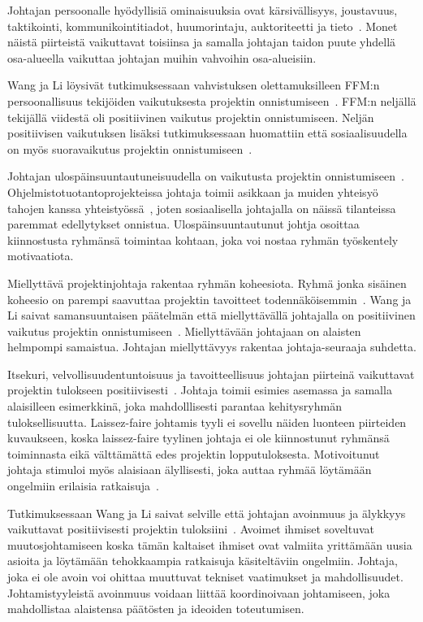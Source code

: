 \documentclass[finnish]{tktltiki2}
\theoremstyle{definition}
\theoremstyle{remark}
\begin{document}
Johtajan persoonalle hyödyllisiä ominaisuuksia ovat kärsivällisyys, joustavuus, taktikointi, kommunikointitiadot, huumorintaju, auktoriteetti ja tieto~\cite{4017705}. Monet näistä piirteistä vaikuttavat toisiinsa ja samalla johtajan taidon puute yhdellä osa-alueella vaikuttaa johtajan muihin vahvoihin osa-alueisiin. 

Wang ja Li löysivät tutkimuksessaan vahvistuksen olettamuksilleen FFM:n persoonallisuus tekijöiden vaikutuksesta projektin onnistumiseen~\cite{Wang:2009:PMP:1639950.1640049}. FFM:n neljällä tekijällä viidestä oli positiivinen vaikutus projektin onnistumiseen. Neljän positiivisen vaikutuksen lisäksi tutkimuksessaan huomattiin että sosiaalisuudella on myös suoravaikutus projektin onnistumiseen~\cite{Wang:2009:PMP:1639950.1640049}. 

Johtajan ulospäinsuuntautuneisuudella on vaikutusta projektin onnistumiseen~\cite{Wang:2009:PMP:1639950.1640049}. Ohjelmistotuotantoprojekteissa johtaja toimii asikkaan ja muiden yhteisyö tahojen kanssa yhteistyössä~\cite{McLeod:2011:FAS:1978802.1978803}, joten sosiaalisella johtajalla on näissä tilanteissa paremmat edellytykset onnistua. Ulospäinsuuntautunut johtja osoittaa kiinnostusta ryhmänsä toimintaa kohtaan, joka voi nostaa ryhmän työskentely motivaatiota.  


Miellyttävä projektinjohtaja rakentaa ryhmän koheesiota. Ryhmä jonka sisäinen koheesio on parempi saavuttaa projektin tavoitteet todennäköisemmin~\cite{bahli2005group}. Wang ja Li saivat samansuuntaisen päätelmän että miellyttävällä johtajalla on positiivinen vaikutus projektin onnistumiseen~\cite{Wang:2009:PMP:1639950.1640049}. Miellyttävään johtajaan on alaisten helmpompi samaistua. Johtajan miellyttävyys rakentaa johtaja-seuraaja suhdetta.

Itsekuri, velvollisuudentuntoisuus ja tavoitteellisuus johtajan piirteinä vaikuttavat projektin tulokseen positiivisesti~\cite{Wang:2009:PMP:1639950.1640049}. Johtaja toimii esimies asemassa ja samalla alaisilleen esimerkkinä, joka mahdolllisesti parantaa kehitysryhmän tuloksellisuutta. Laissez-faire johtamis tyyli ei sovellu näiden luonteen piirteiden kuvaukseen, koska laissez-faire tyylinen johtaja ei ole kiinnostunut ryhmänsä toiminnasta eikä välttämättä edes projektin lopputuloksesta. Motivoitunut johtaja stimuloi myös alaisiaan älyllisesti, joka auttaa ryhmää löytämään ongelmiin erilaisia ratkaisuja~\cite{thite2000leadership}.

Tutkimuksessaan Wang ja Li saivat selville että johtajan avoinmuus ja älykkyys vaikuttavat positiivisesti  projektin tuloksiini~\cite{Wang:2009:PMP:1639950.1640049}. Avoimet ihmiset soveltuvat muutosjohtamiseen koska tämän kaltaiset ihmiset ovat valmiita yrittämään uusia asioita ja löytämään tehokkaampia ratkaisuja käsiteltäviin ongelmiin. Johtaja, joka ei ole avoin voi ohittaa muuttuvat tekniset vaatimukset ja mahdollisuudet. Johtamistyyleistä avoinmuus voidaan liittää koordinoivaan johtamiseen, joka mahdollistaa alaistensa päätösten ja ideoiden toteutumisen.
\end{document}

